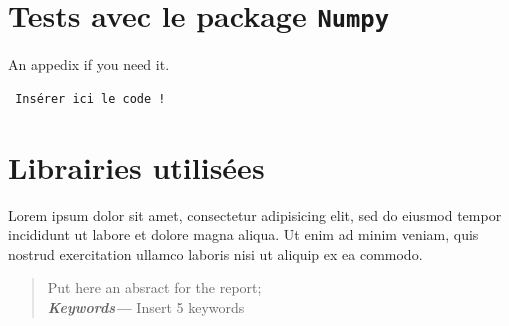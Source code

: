\documentclass[a4paper, oneside, french, 12pt, final]{extreport}
\providecommand{\keywords}[1]{\textbf{\textit{Keywords---}} #1}
\begin{document}
\section{Tests avec le package {\tt Numpy}}

 An appedix if you need it.
 
 \begin{verbatim}
 Insérer ici le code !
 \end{verbatim}

\section{Librairies utilisées}
 
  Lorem ipsum dolor sit amet, consectetur adipisicing elit, sed do eiusmod
  tempor incididunt ut labore et dolore magna aliqua. Ut enim ad minim veniam,
  quis nostrud exercitation ullamco laboris nisi ut aliquip ex ea commodo.






\cleardoublepage%


\printglossaries
\printindex

\begin{abstract}

Put here an absract for the report; \\

\keywords{Insert 5 keywords}
\end{abstract}
\end{document}
